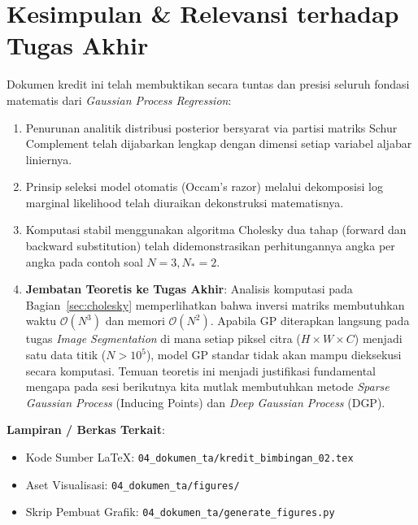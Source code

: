 \documentclass[11pt,a4paper]{article}
\begin{document}
\section{Kesimpulan \& Relevansi terhadap Tugas Akhir}
\label{sec:kesimpulan}

Dokumen kredit ini telah membuktikan secara tuntas dan presisi seluruh fondasi matematis dari \textit{Gaussian Process Regression}:
\begin{enumerate}
    \item Penurunan analitik distribusi posterior bersyarat via partisi matriks Schur Complement telah dijabarkan lengkap dengan dimensi setiap variabel aljabar liniernya.
    \item Prinsip seleksi model otomatis (Occam's razor) melalui dekomposisi log marginal likelihood telah diuraikan dekonstruksi matematisnya.
    \item Komputasi stabil menggunakan algoritma Cholesky dua tahap (forward dan backward substitution) telah didemonstrasikan perhitungannya angka per angka pada contoh soal $N = 3, N_* = 2$.
    \item \textbf{Jembatan Teoretis ke Tugas Akhir}: Analisis komputasi pada Bagian~\ref{sec:cholesky} memperlihatkan bahwa inversi matriks membutuhkan waktu $\mathcal{O}(N^3)$ dan memori $\mathcal{O}(N^2)$. Apabila GP diterapkan langsung pada tugas \textit{Image Segmentation} di mana setiap piksel citra ($H \times W \times C$) menjadi satu data titik ($N > 10^5$), model GP standar tidak akan mampu dieksekusi secara komputasi. Temuan teoretis ini menjadi justifikasi fundamental mengapa pada sesi berikutnya kita mutlak membutuhkan metode \textit{Sparse Gaussian Process} (Inducing Points) dan \textit{Deep Gaussian Process} (DGP).
\end{enumerate}

\vspace{0.8cm}
\noindent
\textbf{Lampiran / Berkas Terkait}:
\begin{itemize}
    \item Kode Sumber LaTeX: \texttt{04\_dokumen\_ta/kredit\_bimbingan\_02.tex}
    \item Aset Visualisasi: \texttt{04\_dokumen\_ta/figures/}
    \item Skrip Pembuat Grafik: \texttt{04\_dokumen\_ta/generate\_figures.py}
\end{itemize}
\end{document}
